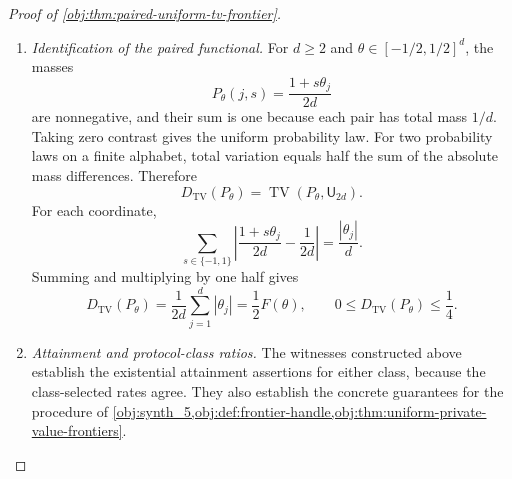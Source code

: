 \begin{proof}[Proof of \cref{obj:thm:paired-uniform-tv-frontier}]
\begin{enumerate}
The construction belongs to both protocol classes. Its interval, being contained in \([0,1/4]\), is also an admissible interval in the optimization over \([0,1]\).
Taking the corresponding candidates in the minimax infima gives, for either \(\mathcal C\),
\[
\mathfrak R^{\mathrm{TV}}_{\mathcal C}
(\mathcal P_d^{\mathrm{pair}};n,d,\varepsilon)
\le C_0\rho(t,d),
\qquad
\mathfrak H^{\mathrm{TV}}_{\mathcal C}
(\mathcal P_d^{\mathrm{pair}};n,d,\varepsilon)
\le C_0\sqrt{\rho(t,d)}.
\]
Since \(c\le c_{\mathrm{lower}}\) and both rates are nonnegative, the lower bounds proved above give
\[
\begin{aligned}
c\rho(t,d)
&\le\mathfrak R^{\mathrm{TV}}_{\mathcal C}
(\mathcal P_d^{\mathrm{pair}};n,d,\varepsilon)
\le C_0\rho(t,d),\\
c\sqrt{\rho(t,d)}
&\le\mathfrak H^{\mathrm{TV}}_{\mathcal C}
(\mathcal P_d^{\mathrm{pair}};n,d,\varepsilon)
\le C_0\sqrt{\rho(t,d)}.
\end{aligned}
\]

\item \textit{Identification of the paired functional.}
For \(d\ge2\) and \(\theta\in[-1/2,1/2]^d\), the masses
\[
P_\theta(j,s)=\frac{1+s\theta_j}{2d}
\]
are nonnegative, and their sum is one because each pair has total mass \(1/d\).
Taking zero contrast gives the uniform probability law.
For two probability laws on a finite alphabet, total variation equals half the sum of the absolute mass differences. Therefore
\[
D_{\mathrm{TV}}(P_\theta)
=\operatorname{TV}(P_\theta,\mathsf U_{2d}).
\]
For each coordinate,
\[
\sum_{s\in\{-1,1\}}
\left|\frac{1+s\theta_j}{2d}-\frac1{2d}\right|
=
\frac{|\theta_j|}{d}.
\]
Summing and multiplying by one half gives
\[
D_{\mathrm{TV}}(P_\theta)
=\frac1{2d}\sum_{j=1}^d|\theta_j|
=\frac12F(\theta),
\qquad
0\le D_{\mathrm{TV}}(P_\theta)\le\frac14.
\]

\item \textit{Attainment and protocol-class ratios.}
The witnesses constructed above establish the existential attainment assertions for either class, because the class-selected rates agree. They also establish the concrete guarantees for the procedure of
\cref{obj:synth_5,obj:def:frontier-handle,obj:thm:uniform-private-value-frontiers}.


\end{enumerate}
\end{proof}
